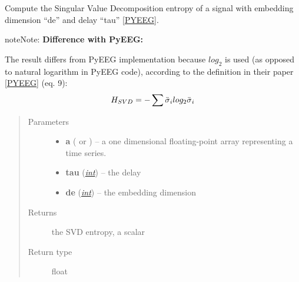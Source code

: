 \documentclass[letterpaper,10pt,english]{sphinxmanual}
\begin{document}
\begin{fulllineitems}
\label{pyrem.univariate:pyrem.univariate.svd_entropy}
Compute the Singular Value Decomposition entropy of a signal with embedding dimension ``de'' and delay ``tau'' {\hyperref[pyrem.univariate:pyeeg]{{[}PYEEG{]}}}.

\begin{notice}{note}{Note:}
\textbf{Difference with PyEEG:}

The result differs from PyEEG implementation because \(log_2\) is used (as opposed to natural logarithm in PyEEG code),
according to the definition in their paper {\hyperref[pyrem.univariate:pyeeg]{{[}PYEEG{]}}} (eq. 9):
\begin{gather}
\begin{split}H_{SVD} = -\sum{\bar\sigma{}_i log_2 \bar\sigma{}_i}\end{split}\notag
\end{gather}\end{notice}
\begin{quote}\begin{description}
\item[{Parameters}] \leavevmode\begin{itemize}
\item {} 
\textbf{a} (\href{http://docs.scipy.org/doc/numpy/reference/generated/numpy.ndarray.html\#numpy.ndarray}{} or {\hyperref[pyrem.time_series:pyrem.time_series.Signal]{}}) -- a one dimensional floating-point array representing a time series.

\item {} 
\textbf{tau} (\href{http://docs.python.org/2.7/library/functions.html\#int}{\emph{int}}) -- the delay

\item {} 
\textbf{de} (\href{http://docs.python.org/2.7/library/functions.html\#int}{\emph{int}}) -- the embedding dimension

\end{itemize}

\item[{Returns}] \leavevmode
the SVD entropy, a scalar

\item[{Return type}] \leavevmode
float

\end{description}\end{quote}

\end{fulllineitems}
\end{document}
